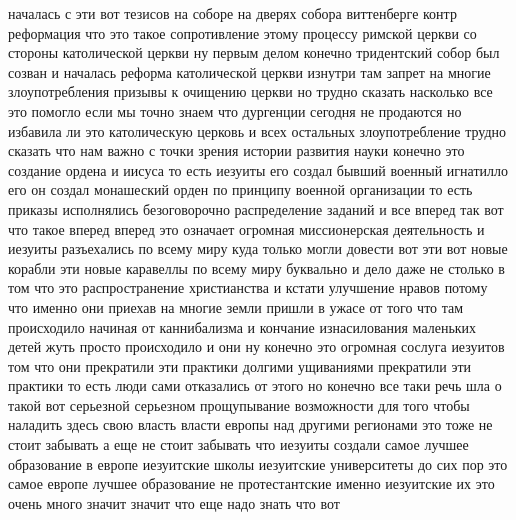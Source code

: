 началась с
эти вот тезисов на соборе на дверях собора виттенберге контр реформация что это
такое сопротивление этому процессу римской церкви со стороны католической церкви
ну первым делом конечно тридентский собор был созван и началась реформа
католической церкви изнутри там запрет на многие злоупотребления призывы к
очищению церкви но трудно сказать насколько все это помогло если мы точно знаем
что дургенции сегодня не продаются но избавила ли это католическую церковь и
всех остальных злоупотребление трудно сказать что нам важно с точки зрения
истории развития науки конечно это создание ордена и иисуса то есть иезуиты его
создал бывший военный игнатилло его он создал монашеский орден по принципу
военной организации то есть приказы исполнялись безоговорочно распределение
заданий и все вперед так вот что такое вперед вперед это означает огромная
миссионерская деятельность и иезуиты разъехались по всему миру куда только могли
довести вот эти вот новые корабли эти новые каравеллы по всему миру буквально и
дело даже не столько в том что это распространение христианства и кстати
улучшение нравов потому что именно они приехав на многие земли пришли в ужасе от
того что там происходило начиная от каннибализма и кончание изнасилования
маленьких детей жуть просто происходило и они ну конечно это огромная сослуга
иезуитов том что они прекратили эти практики долгими ущиваниями прекратили эти
практики то есть люди сами отказались от этого но конечно все таки речь шла о
такой вот серьезной серьезном прощупывание возможности для того чтобы наладить
здесь свою власть власти европы над другими регионами это тоже не стоит забывать
а еще не стоит забывать что иезуиты создали самое лучшее образование в европе
иезуитские школы иезуитские университеты до сих пор это самое европе лучшее
образование не протестантские именно иезуитские их это очень много значит значит
что еще надо знать что вот 

